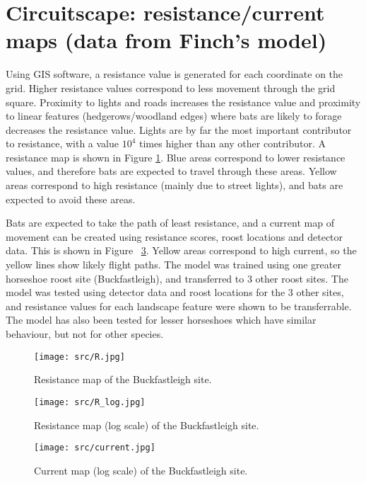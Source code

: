 
\section{Circuitscape: resistance/current maps (data from Finch's model)}

Using GIS software, a resistance value is generated for each coordinate on the grid. Higher resistance values correspond to less movement through the grid square. Proximity to lights and roads increases the resistance value and proximity to linear features (hedgerows/woodland edges) where bats are likely to forage decreases the resistance value. Lights are by far the most important contributor to resistance, with a value $10^4$ times higher than any other contributor. A resistance map is shown in Figure \ref{fig:resistance}. Blue areas correspond to lower resistance values, and therefore bats are expected to travel through these areas. Yellow areas correspond to high resistance (mainly due to street lights), and bats are expected to avoid these areas.

Bats are expected to take the path of least resistance, and a current map of
movement can be created using resistance scores, roost locations and detector
data. This is shown in Figure ~\ref{fig:current}. Yellow areas correspond to high current, so the yellow lines show likely flight paths. The model was trained using one greater horseshoe roost site (Buckfastleigh), and transferred to 3 other roost sites. The model was tested using detector data and roost locations for the 3 other sites, and resistance values for each landscape feature were shown to be transferrable. The model has also been tested for lesser horseshoes which have similar behaviour, but not for other species.

\begin{figure}
    \centering
    \texttt{[image: src/R.jpg]}
    \caption{Resistance map of the Buckfastleigh site. }
    \label{fig:resistance}
\end{figure}
\begin{figure}
    \centering
    \texttt{[image: src/R\_log.jpg]}
    \caption{Resistance map (log scale) of the Buckfastleigh site.}
    \label{fig:resistance_log}
\end{figure}

\begin{figure}
    \centering
    \texttt{[image: src/current.jpg]}
    \caption{Current map (log scale) of the Buckfastleigh site.}
    \label{fig:current}
\end{figure}


